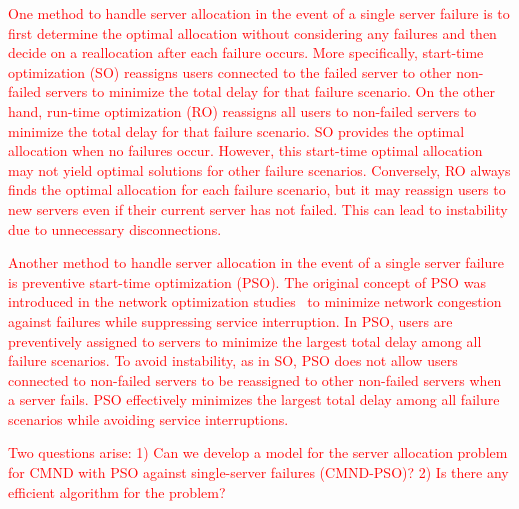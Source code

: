 \documentclass[10pt, letterpaper]{IEEEtran}
\newcommand\red[1]{\textcolor{red}{#1}}
\begin{document}
\begin{CJK}{UTF8}{ipxm}
\red{
One method to handle server allocation in the event of a single server failure is to first determine the optimal allocation without considering any failures and then decide on a reallocation after each failure occurs.
More specifically, start-time optimization (SO) reassigns users connected to the failed server to other non-failed servers to minimize the total delay for that failure scenario. On the other hand, 
run-time optimization (RO) reassigns all users to non-failed servers to minimize the total delay for that failure scenario.
SO provides the optimal allocation when no failures occur.
However, this start-time optimal allocation may not yield optimal solutions for other failure scenarios.
Conversely, RO always finds the optimal allocation for each failure scenario, but it may reassign users to new servers even if their current server has not failed.
This can lead to instability due to unnecessary disconnections.
}

\red{
Another method to handle server allocation in the event of a single server failure is preventive start-time optimization (PSO). The original concept of PSO was introduced in the network optimization studies~\cite{5_9_13_Kamrul2010,OkiDRCN2014} to minimize network congestion against failures while suppressing service interruption.
In PSO, users are preventively assigned to servers to minimize the largest total delay among all failure scenarios. 
To avoid instability, as in SO, PSO does not allow users connected to non-failed servers to be reassigned to other non-failed servers when a server fails.
PSO effectively minimizes the largest total delay among all failure scenarios while avoiding service interruptions.
}

\red{
Two questions arise: 
1) Can we develop a model for the server allocation problem for CMND with PSO against single-server failures (CMND-PSO)?
2) Is there any efficient algorithm for the problem?
}


\end{CJK}
\end{document}
